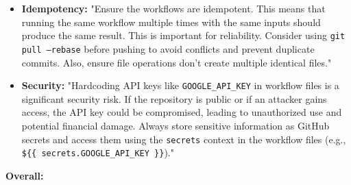 \documentclass{article}
\begin{document}
\begin{itemize}
\begin{itemize}
\begin{itemize}
\begin{itemize}
        \item \textbf{Idempotency:} "Ensure the workflows are idempotent. This means that running the same workflow multiple times with the same inputs should produce the same result.  This is important for reliability.  Consider using \texttt{git pull --rebase} before pushing to avoid conflicts and prevent duplicate commits. Also, ensure file operations don't create multiple identical files."

        \item \textbf{Security:} "Hardcoding API keys like \texttt{GOOGLE\_API\_KEY} in workflow files is a significant security risk. If the repository is public or if an attacker gains access, the API key could be compromised, leading to unauthorized use and potential financial damage. Always store sensitive information as GitHub secrets and access them using the \texttt{secrets} context in the workflow files (e.g., \texttt{\$\{\{ secrets.GOOGLE\_API\_KEY \}\}})."
\end{itemize}

\textbf{Overall:}


\end{itemize}
\end{itemize}
\end{itemize}
\end{document}
